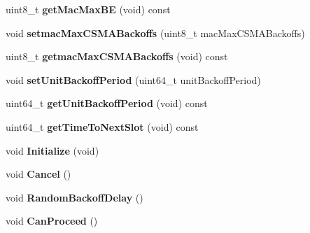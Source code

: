 \begin{DoxyCompactItemize}
\item 
\hypertarget{classns3_1_1PLC__CsmaCa_a0d0ecb143f6328464e1de1a7bc6b539e}{uint8\-\_\-t {\bfseries get\-Mac\-Max\-B\-E} (void) const }\label{classns3_1_1PLC__CsmaCa_a0d0ecb143f6328464e1de1a7bc6b539e}

\item 
\hypertarget{classns3_1_1PLC__CsmaCa_a2f7059808f5f75be044367bf345fa6a7}{void {\bfseries setmac\-Max\-C\-S\-M\-A\-Backoffs} (uint8\-\_\-t mac\-Max\-C\-S\-M\-A\-Backoffs)}\label{classns3_1_1PLC__CsmaCa_a2f7059808f5f75be044367bf345fa6a7}

\item 
\hypertarget{classns3_1_1PLC__CsmaCa_ae56726929f60c5c81a123f6b82a0ec30}{uint8\-\_\-t {\bfseries getmac\-Max\-C\-S\-M\-A\-Backoffs} (void) const }\label{classns3_1_1PLC__CsmaCa_ae56726929f60c5c81a123f6b82a0ec30}

\item 
\hypertarget{classns3_1_1PLC__CsmaCa_a36882837b0c7f2a6ffb2fbe36b2e54f1}{void {\bfseries set\-Unit\-Backoff\-Period} (uint64\-\_\-t unit\-Backoff\-Period)}\label{classns3_1_1PLC__CsmaCa_a36882837b0c7f2a6ffb2fbe36b2e54f1}

\item 
\hypertarget{classns3_1_1PLC__CsmaCa_a11e4060ce3cc673eb538e57bd2ca03c2}{uint64\-\_\-t {\bfseries get\-Unit\-Backoff\-Period} (void) const }\label{classns3_1_1PLC__CsmaCa_a11e4060ce3cc673eb538e57bd2ca03c2}

\item 
\hypertarget{classns3_1_1PLC__CsmaCa_af7c76f10c1638a3a4ade03a1034cb05d}{uint64\-\_\-t {\bfseries get\-Time\-To\-Next\-Slot} (void) const }\label{classns3_1_1PLC__CsmaCa_af7c76f10c1638a3a4ade03a1034cb05d}

\item 
\hypertarget{classns3_1_1PLC__CsmaCa_ad5637ae180a675c63e7325ff35748d1f}{void {\bfseries \-Initialize} (void)}\label{classns3_1_1PLC__CsmaCa_ad5637ae180a675c63e7325ff35748d1f}

\item 
\hypertarget{classns3_1_1PLC__CsmaCa_acda66d73f1948d040843bda1f8e3d01f}{void {\bfseries \-Cancel} ()}\label{classns3_1_1PLC__CsmaCa_acda66d73f1948d040843bda1f8e3d01f}

\item 
\hypertarget{classns3_1_1PLC__CsmaCa_a73bec7115539950445814005a725ee67}{void {\bfseries \-Random\-Backoff\-Delay} ()}\label{classns3_1_1PLC__CsmaCa_a73bec7115539950445814005a725ee67}

\item 
\hypertarget{classns3_1_1PLC__CsmaCa_a71222a09dd34258d738fd9a907c5a4b0}{void {\bfseries \-Can\-Proceed} ()}\label{classns3_1_1PLC__CsmaCa_a71222a09dd34258d738fd9a907c5a4b0}


\end{DoxyCompactItemize}
